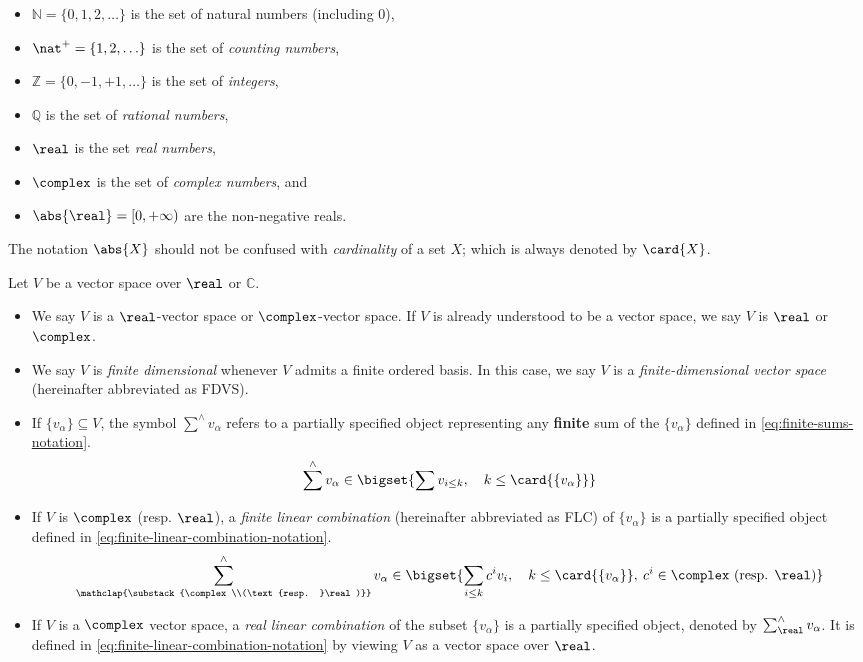 \documentclass[../main-v2-manifolds.tex]{subfiles}
\begin{document}
\begin{itemize}
    \item $\mathbb{N}= \{0,1,2,\ldots\}$ is the set of natural numbers (including $0$),
    \item $\nat^+= \{1,2,\ldots \}$ is the set of \emph{counting numbers}, 
    \item $\mathbb{Z}=\{0,-1,+1,\ldots\}$ is the set of \emph{integers},
    \item $\mathbb{Q}$ is the set of \emph{rational numbers},
    \item $\real$ is the set \emph{real numbers}, 
    \item $\complex$ is the set of \emph{complex numbers}, and
    \item $\abs{\real}=[0,+\infty)$ are the non-negative reals.
\end{itemize}
\begin{remark}[Cardinality]
The notation $\abs{X}$ should not be confused with \emph{cardinality} of a set $X$; which is always denoted by $\card{X}$.     
\end{remark}
Let $V$ be a vector space over $\real$ or $\mathbb{C}$. 
\begin{itemize}
    \item We say $V$ is a $\real$-vector space or $\complex$-vector space. If $V$ is already understood to be a vector space, we say $V$ is $\real$ or $\complex$.
    \item We say $V$ is \emph{finite dimensional} whenever $V$ admits a finite ordered basis. In this case, we say $V$ is a \emph{finite-dimensional vector space} (hereinafter abbreviated as FDVS).
    \item If $\{v_{\alpha}\}\subseteq V$, the symbol $\sum^{\wedge}v_\alpha$ refers to a partially specified object representing any \textbf{finite} sum of the $\{v_{\alpha}\}$ defined in \cref{eq:finite-sums-notation}.
    \begin{equation}\label{eq:finite-sums-notation}
    \sum^\wedge v_{\alpha} \in\bigset{\sum v_{i\leq k},\quad k\leq \card{\{v_\alpha\}}}
    \end{equation}
    \item If $V$ is $\complex$ (resp. $\real$), a \emph{finite linear combination} (hereinafter abbreviated as FLC) of $\{v_\alpha\}$ is a partially specified object defined in \cref{eq:finite-linear-combination-notation}.
    \begin{equation}
        \sum^\wedge_{\mathclap{\substack{\complex\\(\text{resp. }\real)}}}v_\alpha \in\bigset{\sum_{i\leq k}c^iv_i,\quad k\leq\card{\{v_\alpha\}},\: c^i\in\complex \text{ (resp. }\real\text{)}}
        \label{eq:finite-linear-combination-notation}
    \end{equation}
    \item If $V$ is a $\complex$ vector space, a \emph{real linear combination} of the subset $\{v_{\alpha}\}$ is a partially specified object, denoted by $\sum^\wedge_\real v_{\alpha}$. It is defined in \cref{eq:finite-linear-combination-notation} by viewing $V$ as a vector space over $\real$.
    \end{itemize}
\end{document}
